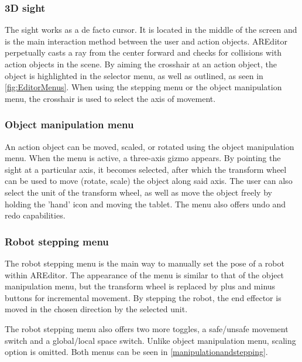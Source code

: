 \subsubsection{3D sight}
The sight works as a de facto cursor. It is located in the middle of the screen and is the main interaction method between the user and action objects. AREditor perpetually casts a ray from the center forward and checks for collisions with action objects in the scene. By aiming the crosshair at an action object, the object is highlighted in the selector menu, as well as outlined, as seen in \ref{fig:EditorMenus}. When using the stepping menu or the object manipulation menu, the crosshair is used to select the axis of movement. 

\subsubsection{Object manipulation menu}
An action object can be moved, scaled, or rotated using the object manipulation menu. When the menu is active, a three-axis gizmo appears. By pointing the sight at a particular axis, it becomes selected, after which the transform wheel can be used to move (rotate, scale) the object along said axis. The user can also select the unit of the transform wheel, as well as move the object freely by holding the 'hand' icon and moving the tablet. The menu also offers undo and redo capabilities.


\subsubsection{Robot stepping menu}
The robot stepping menu is the main way to manually set the pose of a robot within AREditor. The appearance of the menu is similar to that of the object manipulation menu, but the transform wheel is replaced by plus and minus buttons for incremental movement. By stepping the robot, the end effector is moved in the chosen direction by the selected unit. 

The robot stepping menu also offers two more toggles, a safe/unsafe movement switch and a global/local space switch. Unlike object manipulation menu, scaling option is omitted. Both menus can be seen in \ref{manipulationandstepping}.

